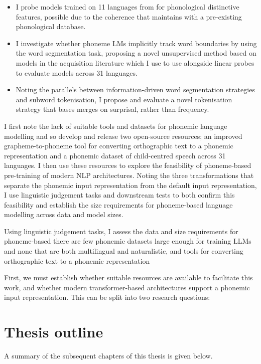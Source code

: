 \begin{itemize}
    \item I probe models trained on 11 languages from \ipachildes for phonological distinctive features, possible due to the coherence that \gpp maintains with a pre-existing phonological database. 
    \item I investigate whether phoneme LMs implicitly track word boundaries by using the word segmentation task, proposing a novel unsupervised method based on models in the acquisition literature which I use to use alongside linear probes to evaluate models across 31 languages.
    \item Noting the parallels between information-driven word segmentation strategies and subword tokenisation, I propose and evaluate a novel tokenisation strategy that bases merges on surprisal, rather than frequency.
\end{itemize}

I first note the lack of suitable tools and datasets for phonemic language modelling and so develop and release two open-source resources; an improved grapheme-to-phoneme tool for converting orthographic text to a phonemic representation and a phonemic dataset of child-centred speech across 31 languages. I then use these resources to explore the feasibility of phoneme-based pre-training of modern NLP architectures. Noting the three transformations that separate the phonemic input representation from the default input representation, I use linguistic judgement tasks and downstream tests to both confirm this feasibility and establish the size requirements for phoneme-based language modelling across data and model sizes. 

Using linguistic judgement tasks, I assess the data and size requirements for phoneme-based there are few phonemic datasets large enough for training LLMs and none that are both multilingual and naturalistic, and tools for converting orthographic text to a phonemic representation 


First, we must establish whether suitable resources are available to facilitate this work, and whether modern transformer-based architectures support a phonemic input representation. This can be split into two research questions:

\section{Thesis outline}

A summary of the subsequent chapters of this thesis is given below.

